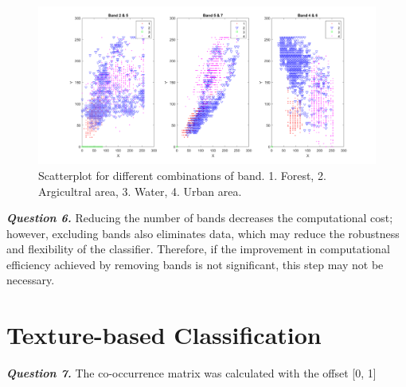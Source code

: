 \documentclass[12pt]{article}
\begin{document}
\begin{figure}
  \centering
  \includegraphics[width = 15cm]{images/Q5_scatter.png}
  \caption{Scatterplot for different combinations of band. 1. Forest, 2. Argicultral area, 3. Water, 4. Urban area. }
  \label{fig:Q5_scatter}
\end{figure}

\textbf{\emph{Question 6.}}
Reducing the number of bands decreases the computational cost; however, excluding bands also eliminates data, which may reduce the robustness and flexibility of the classifier. Therefore, if the improvement in computational efficiency achieved by removing bands is not significant, this step may not be necessary.
\section{Texture-based Classification}
\textbf{\emph{Question 7.}}
The co-occurrence matrix was calculated with the offset [0, 1]
\end{document}
